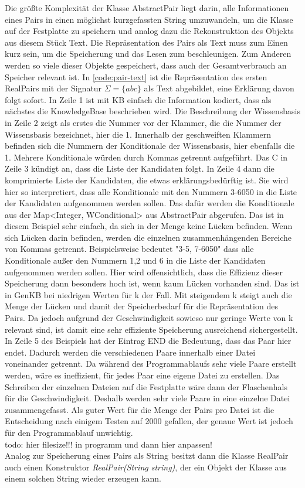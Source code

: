 \documentclass[12pt,a4paper]{article}
\begin{document}
Die größte Komplexität der Klasse AbstractPair liegt darin, alle Informationen eines Pairs in einen möglichst kurzgefassten String umzuwandeln, um die Klasse auf der Festplatte zu speichern und analog dazu die Rekonstruktion des Objekts aus diesem Stück Text. Die Repräsentation des Pairs als Text muss zum Einen kurz sein, um die Speicherung und das Lesen zum beschleunigen. Zum Anderen werden so viele dieser Objekte gespeichert, dass auch der Gesamtverbrauch an Speicher relevant ist. In \autoref{code:pair-text} ist die Repräsentation des ersten RealPairs mit der Signatur $\Sigma=\{abc\}$  als Text abgebildet, eine Erklärung davon folgt sofort. In Zeile 1 ist mit KB einfach die Information kodiert, dass als nächstes die KnowledgeBase beschrieben wird. Die Beschreibung der Wissensbasis in Zeile 2 zeigt als erstes die Nummer vor der Klammer, die die Nummer der Wissensbasis bezeichnet, hier die 1. Innerhalb der geschweiften Klammern befinden sich die Nummern der Konditionale der Wissensbasis, hier ebenfalls die 1. Mehrere Konditionale würden durch Kommas getrennt aufgeführt. Das C in Zeile 3 kündigt an, dass die Liste der Kandidaten folgt. In Zeile 4 dann die komprimierte Liste der Kandidaten, die etwas erklärungsbedürftig ist. Sie wird hier so interpretiert, dass alle Konditionale mit den Nummern 3-6050 in die Liste der Kandidaten aufgenommen werden sollen. Das dafür werden die Konditionale aus der Map<Integer, WConditional> aus AbstractPair abgerufen. Das ist in diesem Beispiel sehr einfach, da sich in der Menge keine Lücken befinden. Wenn sich Lücken darin befinden, werden die einzelnen zusammenhängenden Bereiche von Kommas getrennt. Beispielsweise bedeutet "3-5, 7-6050" dass alle Konditionale außer den Nummern 1,2 und 6 in die Liste der Kandidaten aufgenommen werden sollen. Hier wird offensichtlich, dass die Effizienz dieser Speicherung dann besonders hoch ist, wenn kaum Lücken vorhanden sind. Das ist in GenKB bei niedrigen Werten für k der Fall. Mit steigendem k steigt auch die Menge der Lücken und damit der Speicherbedarf für die Repräsentation des Pairs. Da jedoch aufgrund der Geschwindigkeit sowieso nur geringe Werte von k relevant sind, ist damit eine sehr effiziente Speicherung ausreichend sichergestellt. In Zeile 5 des Beispiels hat der Eintrag END die Bedeutung, dass das Paar hier endet. Dadurch werden die verschiedenen Paare innerhalb einer Datei voneinander getrennt. Da während des Programmablaufs sehr viele Paare erstellt werden, wäre es ineffizient, für jedes Paar eine eigene Datei zu erstellen. Das Schreiben der einzelnen Dateien auf die Festplatte wäre dann der Flaschenhals für die Geschwindigkeit. Deshalb werden sehr viele Paare in eine einzelne Datei zusammengefasst. Als guter Wert für die Menge der Pairs pro Datei ist die Entscheidung nach einigem Testen auf 2000 gefallen, der genaue Wert ist jedoch für den Programmablauf unwichtig. 
\\ todo: hier filesize!!! in programm und dann hier anpassen! \\
Analog zur Speicherung eines Pairs als String besitzt dann die Klasse RealPair auch einen Konstruktor \textit{RealPair(String string)}, der ein Objekt der Klasse aus einem solchen String wieder erzeugen kann.
\end{document}
